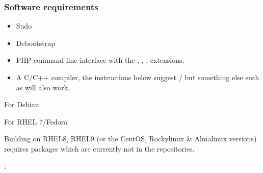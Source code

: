 \documentclass[a4paper,10pt,english,openany]{sphinxmanual}
\begin{document}
\subsubsection{Software requirements}
\label{\detokenize{install-judgehost:software-requirements}}\label{\detokenize{install-judgehost:judgehost-software}}\begin{itemize}
\item {} 
\sphinxAtStartPar
Sudo

\item {} 
\sphinxAtStartPar
Debootstrap

\item {} 
\sphinxAtStartPar
PHP command line interface with the , , ,
 extensions.

\item {} 
\sphinxAtStartPar
A C/C++ compiler, the instructions below suggest / but something
else such as  will also work.

\end{itemize}

\sphinxAtStartPar
For Debian:

\begin{sphinxVerbatim}[commandchars=\\\{\}]
        \PYGZbs{}
              
\end{sphinxVerbatim}

\sphinxAtStartPar
For RHEL 7/Fedora %
\begin{footnote}[*]\sphinxAtStartFootnote
Building on RHEL8, RHEL9 (or the CentOS, Rockylinux \& Almalinux versions)
requires packages which are currently not in the repositories.
%
\end{footnote}:

\begin{sphinxVerbatim}[commandchars=\\\{\}]
        \PYGZbs{}
             \PYGZbs{}
       
\end{sphinxVerbatim}
\end{document}
